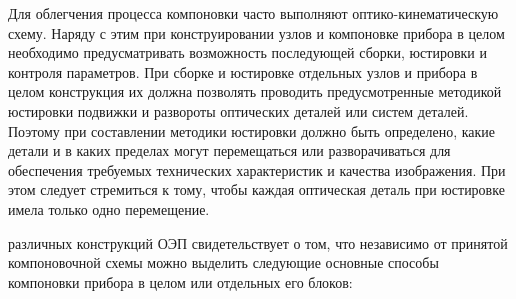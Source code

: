 Для облегчения процесса компоновки часто выполняют оптико-кинематическую схему. Наряду с этим при конструировании узлов и компоновке прибора в целом необходимо предусматривать возможность последующей сборки, юстировки и контроля параметров. При сборке и юстировке отдельных узлов и прибора в целом конструкция их должна позволять проводить предусмотренные методикой юстировки подвижки и развороты оптических деталей или систем деталей. Поэтому при составлении методики юстировки должно быть определено, какие детали и в каких пределах могут перемещаться или разворачиваться для обеспечения требуемых технических характеристик и качества изображения. При этом следует стремиться к тому, чтобы каждая оптическая деталь при юстировке имела только одно перемещение.

 различных конструкций ОЭП свидетельствует о том, что независимо от принятой компоновочной схемы можно выделить следующие основные способы компоновки прибора в целом или отдельных его блоков:
